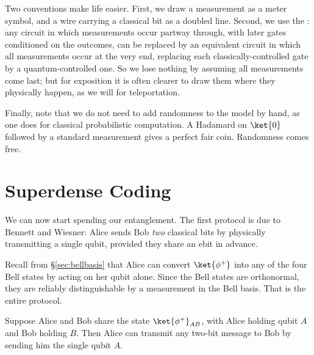 Two conventions make life easier. First, we draw a measurement as a meter symbol, and a wire carrying a classical bit as a doubled line. Second, we use the : any circuit in which measurements occur partway through, with later gates conditioned on the outcomes, can be replaced by an equivalent circuit in which all measurements occur at the very end, replacing each classically-controlled gate by a quantum-controlled one. So we lose nothing by assuming all measurements come last; but for exposition it is often clearer to draw them where they physically happen, as we will for teleportation.

\begin{center}
\end{center}

Finally, note that we do not need to add randomness to the model by hand, as one does for classical probabilistic computation. A Hadamard on $\ket{0}$ followed by a standard measurement gives a perfect fair coin. Randomness comes free.

\section{Superdense Coding}\label{sec:superdense}

We can now start spending our entanglement. The first protocol is due to Bennett and Wiesner: Alice sends Bob \emph{two} classical bits by physically transmitting a single qubit, provided they share an ebit in advance.

Recall from \S\ref{sec:bellbasis} that Alice can convert $\ket{\phi^+}$ into any of the four Bell states by acting on her qubit alone. Since the Bell states are orthonormal, they are reliably distinguishable by a measurement in the Bell basis. That is the entire protocol.

\begin{proposition}
	Suppose Alice and Bob share the state $\ket{\phi^+}_{AB}$, with Alice holding qubit $A$ and Bob holding $B$. Then Alice can transmit any two-bit message to Bob by sending him the single qubit $A$.
\end{proposition}


